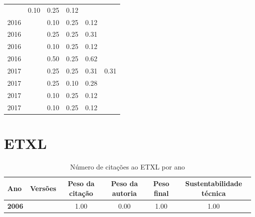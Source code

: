 \begin{table}[H]
\begin{tabular}{| l | c | c | c | c | c |}
          &
          0.10
          &
          0.25
          &
          0.12
          &
          \\
            2016
          &
          
          &
          0.10
          &
          0.25
          &
          0.12
          &
          \\
            2016
          &
          
          &
          0.25
          &
          0.25
          &
          0.31
          &
          \\
            2016
          &
          
          &
          0.10
          &
          0.25
          &
          0.12
          &
          \\
            2016
          &
          
          &
          0.50
          &
          0.25
          &
          0.62
          &
          \\
\hline
            2017
          &
          
          &
          0.25
          &
          0.25
          &
          0.31
          &
            {\color{red} 0.31}
          \\
            2017
          &
          
          &
          0.25
          &
          0.10
          &
          0.28
          &
          \\
            2017
          &
          
          &
          0.10
          &
          0.25
          &
          0.12
          &
          \\
            2017
          &
          
          &
          0.10
          &
          0.25
          &
          0.12
          &
          \\
\hline
\end{tabular}
\end{table}



\section{ETXL}


\begin{table}[H]
\caption{Número de citações ao ETXL por ano}
\centering
\begin{tabular}{| l | c | c | c | c | c |}
  \hline
  Ano & Versões & Peso da citação & Peso da autoria & Peso final & Sustentabilidade técnica \\
  \hline
            {\bf 2006}
          &
          
          &
          1.00
          &
          0.00
          &
          1.00
          &
            {\color{blue} 1.00}
          \\
\hline
\end{tabular}
\end{table}



